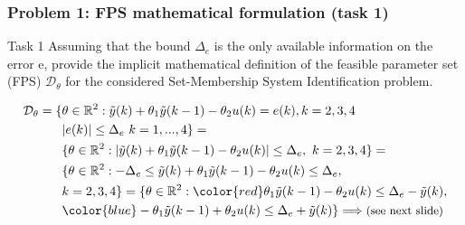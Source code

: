 \documentclass{beamer}
\begin{document}
\begin{frame}
    \frametitle{Problem 1: FPS mathematical formulation (task 1)}
    \begin{alertblock}{Task 1}
        \justifying
        {Assuming that the bound $\Delta_e$ is the only available information on the error e, provide the implicit mathematical definition of the feasible parameter set (FPS) $\mathcal{D}_\theta$ for the considered Set-Membership System Identification problem.}
    \end{alertblock}
    \begin{equation}
        \begin{aligned}
            \mathcal{D}_\theta=\{
                &\theta\in\mathbb{R}^2: \tilde{y}(k)+\theta_1\tilde{y}(k-1)-\theta_2{u(k)}=e(k), k=2,3,4\\
                &\vert e(k) \vert \le \Delta_e \ k=1,...,4 
            \}=\\
            &\{
                \theta \in \mathbb{R}^2: \vert \tilde{y}(k)+\theta_1\tilde{y}(k-1)-\theta_2{u(k)} \vert \le \Delta_e, \ k=2,3,4
            \}=\\
            &\{
                \theta \in \mathbb{R}^2: -\Delta_e \le \tilde{y}(k)+\theta_1\tilde{y}(k-1)-\theta_2{u(k)} \le \Delta_e, \\ &k=2,3,4
            \}=\{
                \theta\in\mathbb{R}^2: 
                {\color{red}\theta_1\tilde{y}(k-1)-\theta_2{u(k)} \le \Delta_e -\tilde{y}(k)},\\
                &{\color{blue}-\theta_1\tilde{y}(k-1)+\theta_2{u(k)} \le \Delta_e +\tilde{y}(k)}
            \} \Longrightarrow \text{\small(see next slide)}
        \end{aligned}
    \end{equation}
\end{frame}
\end{document}
